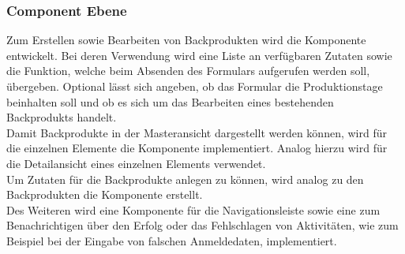 \subsubsection{Component Ebene} \label{dashboard-components}
Zum Erstellen sowie Bearbeiten von Backprodukten wird die Komponente  entwickelt. Bei deren Verwendung wird eine Liste an verfügbaren Zutaten sowie die Funktion, welche beim Absenden des Formulars aufgerufen werden soll, übergeben. Optional lässt sich angeben, ob das Formular die Produktionstage beinhalten soll und ob es sich um das Bearbeiten eines bestehenden Backprodukts handelt.
\\
Damit Backprodukte in der Masteransicht dargestellt werden können, wird für die einzelnen Elemente die Komponente  implementiert. Analog hierzu wird  für die Detailansicht eines einzelnen Elements verwendet.
\\
Um Zutaten für die Backprodukte anlegen zu können, wird analog zu den Backprodukten die Komponente  erstellt.
\\
Des Weiteren wird eine Komponente für die Navigationsleiste sowie eine zum Benachrichtigen über den Erfolg oder das Fehlschlagen von Aktivitäten, wie zum Beispiel bei der Eingabe von falschen Anmeldedaten, implementiert.

\clearpage

